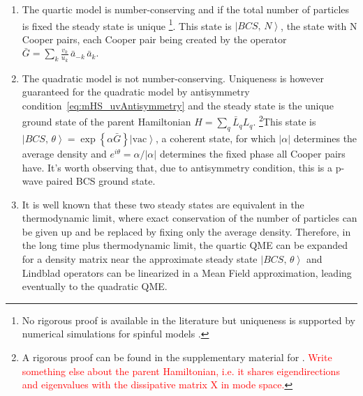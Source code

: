 \documentclass[a4paper,11pt, english]{article}
\theoremstyle{remark}
\newcommand{\ket}[1]{\left | #1 \right \rangle}
\newcommand{\nlspace}{\vskip 0.3cm}
\begin{document}
\begin{enumerate}      
\item The quartic model is number-conserving and if the total number of particles is fixed the steady state is unique \footnote{No rigorous proof is available in the literature but uniqueness is supported by numerical simulations for spinful models \cite{Yi2012}.}. This state is  $\ket{BCS,\,N}$, the state with N Cooper pairs, each Cooper pair being created by the operator $\displaystyle \bar{G}=\sum_{k}\frac{v_k}{u_k}\,\bar{a}_{-k}\,\bar{a}_k$. 
\item The quadratic model is not number-conserving. Uniqueness is however guaranteed for the quadratic model by antisymmetry condition~\eqref{eq:mHS_uvAntisymmetry} and the steady state is the unique ground state of the parent Hamiltonian $H = \sum_q \bar{L}_qL_q$. \footnote{A rigorous proof can be found in the supplementary material for \cite{Bardyn2012}. \textcolor{red}{Write something else about the parent Hamiltonian, i.e. it shares eigendirections and eigenvalues with the dissipative matrix X in mode space.}}This state is $\displaystyle \ket{BCS,\,\theta} = \exp\left\{\alpha\bar{G}\right\}\ket{\text{vac}}$, a coherent state, for which $|\alpha|$ determines the average density and $\displaystyle e^{i\theta}=\alpha/|\alpha|$ determines the fixed phase all Cooper pairs have. It's worth observing that, due to antisymmetry condition, this is a p-wave paired BCS ground state. 
\item It is well known that these two steady states are equivalent in the thermodynamic limit, where exact conservation of the number of particles can be given up and be replaced by fixing only the average density. Therefore, in the long time plus thermodynamic limit, the quartic QME can be expanded for a density matrix near the approximate steady state $\ket{BCS,\,\theta}$ and Lindblad operators can be linearized in a Mean Field approximation, leading eventually to the quadratic QME.  \end{enumerate}
\nlspace
\end{document}

